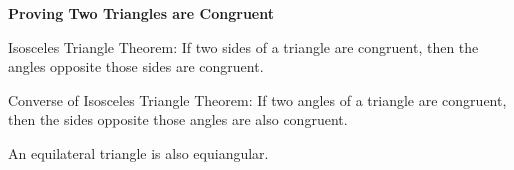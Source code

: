 \begin{center}
\textbf{Proving Two Triangles are Congruent 
}
\end{center}

\vspce



Isosceles Triangle Theorem:  
If two sides of a triangle are congruent, then the angles opposite those sides are congruent.

\vspce 

Converse of Isosceles Triangle Theorem:  If two angles of a triangle are congruent, then the sides opposite those angles are also congruent.

\vspce 

An equilateral triangle is also equiangular. 



